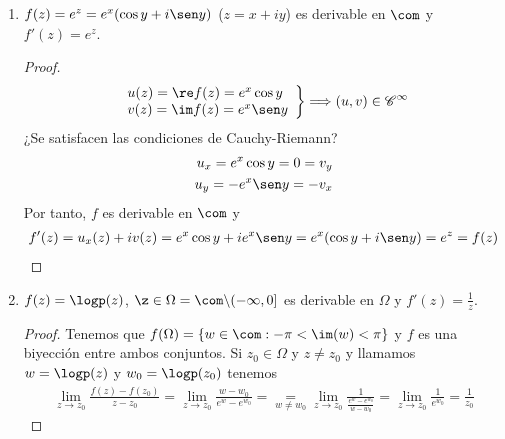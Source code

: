\begin{ejemplo}
\begin{enumerate}
\begin{proof}
\begin{align*}
    \end{align*}
    \end{proof}
    \item $f(z) = e^z = e^x(\cos y + i\sen y)$ ($z = x + iy$) es derivable en $\com$ y $f'(z) = e^z$.
    \begin{proof}
    \begin{align*}
        \left. \begin{array}{lcc}
            u(z) = \re f(z) = e^x \cos y \\
            v(z) = \im f(z) = e^x \sen y\\
             \end{array}
        \right\} \Longrightarrow (u,v) \in \mathscr{C}^{\infty}
    \end{align*}
    ¿Se satisfacen las condiciones de Cauchy-Riemann?
    \begin{align*}
        u_x = e^x \cos y = 0 = v_y\\
        u_y = -e^x \sen y = -v_x
    \end{align*}
    Por tanto, $f$ es derivable en $\com$ y
    \begin{align*}
        f'(z) = u_x(z) + iv(z) = e^x \cos y + i e^x \sen y = e^x(\cos y + i\sen y) = e^z = f(z)
    \end{align*}
    \end{proof}
    \item $f(z) = \logp(z)$, $\z \in \Omega = \com \backslash (-\infty,0]$ es derivable en $\Omega$ y $f'(z) = \frac{1}{z}$.
    \begin{proof}
    Tenemos que $f(\Omega) = \{ w \in \com : -\pi < \im(w) < \pi \}$ y $f$ es una biyección entre ambos conjuntos. Si $z_0 \in \Omega$ y $z \not = z_0$ y llamamos $w = \logp(z)$ y $w_0 = \logp(z_0)$ tenemos
    \begin{align*}
        \lim_{z \to z_0}{\frac{f(z) - f(z_0)}{z - z_0}} = \lim_{z \to z_0}{\frac{w - w_0}{e^{w} - e^{w_0}}} = \underset{w \not = w_0}{=} \lim_{z \to z_0}{\frac{1}{\frac{e^{w} - e^{w_0}}{w - w_0}}} = \lim_{z \to z_0}{\frac{1}{e^{w_0}}} = \frac{1}{z_0}
    \end{align*}
    \end{proof}
\end{enumerate}
\end{ejemplo}

